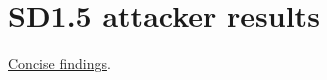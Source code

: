 \section{SD1.5 attacker
results}\label{record-docs-image-attacker-ablation-summary-md-sd1.5-attacker-results}

\href{../results/research_workflow/image_dda/20261025T084419997575Z/summary.md}{Concise
findings}.
